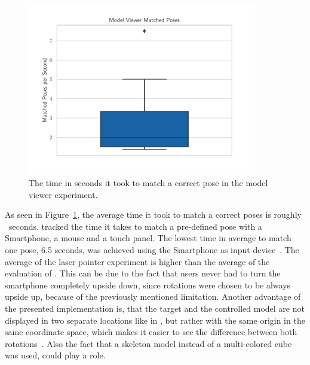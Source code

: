 \begin{figure}[H]
  \centering
  \includegraphics[width=10cm]{figures/evaluation/eval_exp_mv.pdf}
  \caption[Model viewer experiment results]{The time in seconds it took to match a correct pose in the model viewer experiment.}\label{fig:eval-exp-mv}
\end{figure}

%
As seen in Figure~\ref{fig:eval-exp-mv}, the average time it took to match a correct poses is roughly \evalExpMvAvgPoses\ seconds. \citeauthor{Katzakis.2010} tracked the time it takes to match a pre-defined pose with a Smartphone, a mouse and a touch panel. The lowest time in average to match one pose, 6.5 seconds, was achieved using the Smartphone as input device~\cite[140]{Katzakis.2010}. The average of the laser pointer experiment is higher than the average of the evaluation of \citeauthor{Katzakis.2010}. This can be due to the fact that users never had to turn the smartphone completely upside down, since rotations were chosen to be always upside up, because of the previously mentioned limitation. Another advantage of the presented implementation is, that the target and the controlled model are not displayed in two separate locations like in {}, but rather with the same origin in the same coordinate space, which makes it easier to see the difference between both rotations~\cite[140]{Katzakis.2010}. Also the fact that a skeleton model instead of a multi-colored cube was used, could play a role. 

